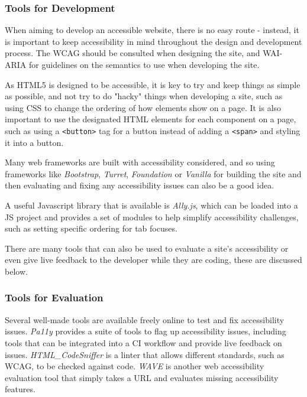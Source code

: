 \documentclass[ %
                    author={Aleena Baig},
                supervisor={Dr Simon Lock},
                    degree={BSc},
                     title={On Making Web Accessible Graphs},
                  subtitle={},
                      year={2019} ]{dissertation}
\begin{document}
\subsubsection{Tools for Development}

When aiming to develop an accessible website, there is no easy route - instead, it is important to keep accessibility in mind throughout the design and development process. The WCAG should be consulted when designing the site, and WAI-ARIA for guidelines on the semantics to use when developing the site.

As HTML5 is designed to be accessible, it is key to try and keep things as simple as possible, and not try to do "hacky" things when developing a site, such as using CSS to change the ordering of how elements show on a page. It is also important to use the designated HTML elements for each component on a page, such as using a \texttt{<button>} tag for a button instead of adding a \texttt{<span>} and styling it into a button.

Many web frameworks are built with accessibility considered, and so using frameworks like \textit{Bootstrap}, \textit{Turret}, \textit{Foundation} or \textit{Vanilla} for building the site and then evaluating and fixing any accessibility issues can also be a good idea.

A useful Javascript library that is available is \textit{Ally.js}, which can be loaded into a JS project and provides a set of modules to help simplify accessibility challenges, such as setting specific ordering for tab focuses.

There are many tools that can also be used to evaluate a site's accessibility or even give live feedback to the developer while they are coding, these are discussed below.

\subsubsection{Tools for Evaluation}

Several well-made tools are available freely online to test and fix accessibility issues. \textit{Pa11y} provides a suite of tools to flag up accessibility issues, including tools that can be integrated into a CI workflow and provide live feedback on issues. \textit{HTML\_CodeSniffer} is a linter that allows different standards, such as WCAG, to be checked against code. \textit{WAVE} is another web accessibility evaluation tool that simply takes a URL and evaluates missing accessibility features.
\end{document}
